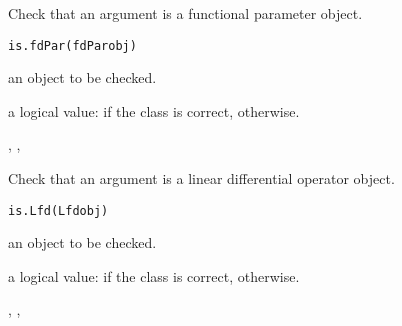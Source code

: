 \documentclass{article}
\begin{document}
\begin{Description}\relax
Check that an argument is a functional parameter object.
\end{Description}
\begin{Usage}
\begin{verbatim}
is.fdPar(fdParobj)
\end{verbatim}
\end{Usage}
\begin{Arguments}
\begin{ldescription}
\item[\code{fdParobj}] an object to be checked.

\end{ldescription}
\end{Arguments}
\begin{Value}
a logical value:
 if the class is correct,  otherwise.
\end{Value}
\begin{SeeAlso}\relax
{}, 
, 
\end{SeeAlso}

\begin{Description}\relax
Check that an argument is a linear differential operator object.
\end{Description}
\begin{Usage}
\begin{verbatim}
is.Lfd(Lfdobj)
\end{verbatim}
\end{Usage}
\begin{Arguments}
\begin{ldescription}
\item[\code{Lfdobj}] an object to be checked.

\end{ldescription}
\end{Arguments}
\begin{Value}
a logical value:
 if the class is correct,  otherwise.
\end{Value}
\begin{SeeAlso}\relax
{}, 
, 
\end{SeeAlso}
\end{document}
